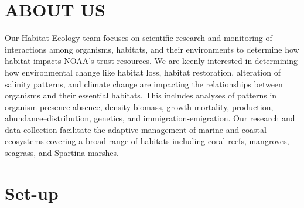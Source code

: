 \documentclass[
  letterpaper,
  oneside,
  open=any]{scrbook}
\renewcommand*\contentsname{Table of contents}
\newcommand\contentsname{Table of contents}
\begin{document}
\begin{frontmatter}
\begin{titlepage}
\begin{minipage}[b][\textheight][s]{\minipagewidth}
\titleblock

\authorblock

\affiliationblock

\vfill

\logoblock

\footerblock
\par

\end{minipage}
\clearpage
\restoregeometry
\end{titlepage}
\setcounter{page}{1}
\end{frontmatter}


\renewcommand*\contentsname{Table of contents}
{
\setcounter{tocdepth}{1}
\tableofcontents
}
\listoffigures
\listoftables
\mainmatter
{}

\hypertarget{about-us}{%
\chapter*{ABOUT US}\label{about-us}}

Our Habitat Ecology team focuses on scientific research and monitoring
of interactions among organisms, habitats, and their environments to
determine how habitat impacts NOAA's trust resources. We are keenly
interested in determining how environmental change like habitat loss,
habitat restoration, alteration of salinity patterns, and climate change
are impacting the relationships between organisms and their essential
habitats. This includes analyses of patterns in organism
presence-absence, density-biomass, growth-mortality, production,
abundance--distribution, genetics, and immigration-emigration. Our
research and data collection facilitate the adaptive management of
marine and coastal ecosystems covering a broad range of habitats
including coral reefs, mangroves, seagrass, and Spartina marshes.


\hypertarget{set-up}{%
\chapter{Set-up}\label{set-up}}
\end{document}
